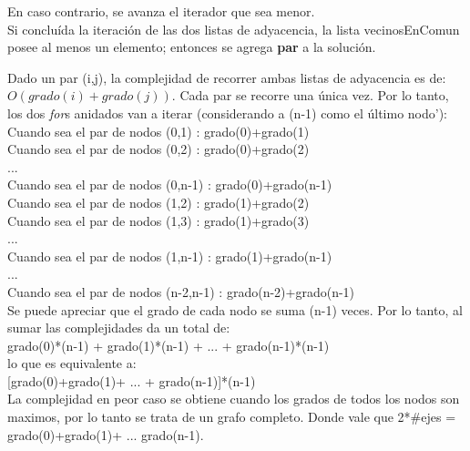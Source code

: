 En caso contrario, se avanza el iterador que sea menor.\\

Si conclu\'ida la iteraci\'on de las dos listas de adyacencia, la lista vecinosEnComun posee al menos un elemento; entonces se agrega \textbf{par} a la soluci\'on.

Dado un par (i,j), la complejidad de recorrer ambas listas de adyacencia es de: $O(grado(i)+grado(j))$.
Cada par se recorre una \'unica vez. Por lo tanto, los dos \emph{for}s anidados van a iterar (considerando a (n-1) como el \'ultimo nodo'):\\

Cuando sea el par de nodos (0,1) : grado(0)+grado(1) \\

Cuando sea el par de nodos (0,2) : grado(0)+grado(2) \\

...\\

Cuando sea el par de nodos (0,n-1) : grado(0)+grado(n-1)\\

Cuando sea el par de nodos (1,2) : grado(1)+grado(2)\\

Cuando sea el par de nodos (1,3) : grado(1)+grado(3)\\

...\\

Cuando sea el par de nodos (1,n-1) : grado(1)+grado(n-1)\\

...\\

Cuando sea el par de nodos (n-2,n-1) : grado(n-2)+grado(n-1)\\


Se puede apreciar que el grado de cada nodo se suma (n-1) veces. Por lo tanto, al sumar las complejidades da un total de:\\

grado(0)*(n-1) + grado(1)*(n-1) + ... + grado(n-1)*(n-1)\\

lo que es equivalente a:\\

[grado(0)+grado(1)+ ... + grado(n-1)]*(n-1)\\

La complejidad en peor caso se obtiene cuando los grados de todos los nodos son maximos, por lo tanto se trata de un grafo completo.
Donde vale que 2*\#ejes = grado(0)+grado(1)+ ... grado(n-1).\\

